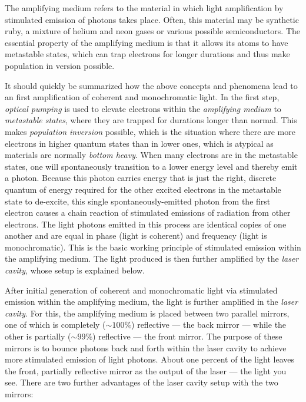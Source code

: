 \begin{itemize}

	The amplifying medium refers to the material in which light amplification by stimulated emission of photons takes place. Often, this material may be synthetic ruby, a mixture of helium and neon gases or various possible semiconductors. The essential property of the amplifying medium is that it allows its atoms to have metastable states, which can trap electrons for longer durations and thus make population in version possible.

\end{itemize}

It should quickly be summarized how the above concepts and phenomena lead to an first amplification of coherent and monochromatic light. In the first step, \emph{optical pumping} is used to elevate electrons within the \emph{amplifying medium} to \emph{metastable states}, where they are trapped for durations longer than normal. This makes \emph{population inversion} possible, which is the situation where there are more electrons in higher quantum states than in lower ones, which is atypical as materials are normally \emph{bottom heavy}. When many electrons are in the metastable states, one will spontaneously transition to a lower energy level and thereby emit a photon. Because this photon carries energy that is just the right, discrete quantum of energy required for the other excited electrons in the metastable state to de-excite, this single spontaneously-emitted photon from the first electron causes a chain reaction of stimulated emissions of radiation from other electrons. The light photons emitted in this process are identical copies of one another and are equal in phase (light is coherent) and frequency (light is monochromatic). This is the basic working principle of stimulated emission within the amplifying medium. The light produced is then further amplified by the \emph{laser cavity}, whose setup is explained below.


After initial generation of coherent and monochromatic light via stimulated emission within the amplifying medium, the light is further amplified in the \emph{laser cavity}. For this, the amplifying medium is placed between two parallel mirrors, one of which is completely ($\sim 100\%$) reflective --- the back mirror --- while the other is partially ($\sim 99\%$) reflective --- the front mirror. The purpose of these mirrors is to bounce photons back and forth within the laser cavity to achieve more stimulated emission of light photons. About one percent of the light leaves the front, partially reflective mirror as the output of the laser --- the light you see. There are two further advantages of the laser cavity setup with the two mirrors:

